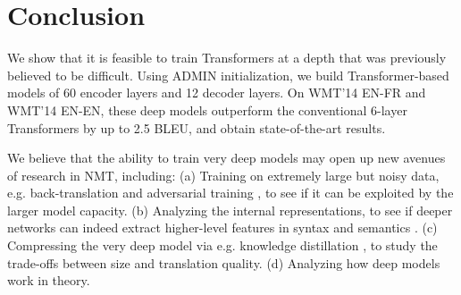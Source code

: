 
\section{Conclusion}
\label{sec:conclusion}
We show that it is feasible to train Transformers at a depth that was previously believed to be difficult. 
Using ADMIN initialization, we build Transformer-based models of 60 encoder layers and 12 decoder layers. On WMT'14 EN-FR and WMT'14 EN-EN, these deep models outperform the conventional 6-layer Transformers by up to 2.5 BLEU, and obtain state-of-the-art results.

We believe that the ability to train very deep models may open up new avenues of research in NMT, including:
(a) Training on extremely large but noisy data, e.g. back-translation \cite{edunov2018back-nmt} and adversarial training \cite{cheng2019robust,liu2020alum}, to see if it can be exploited by the larger model capacity. 
(b) Analyzing the internal representations, to see if deeper networks can indeed extract higher-level features in syntax and semantics \cite{belinkov19}. (c) Compressing the very deep model via e.g. knowledge distillation \cite{kim-rush-2016-sequence}, to study the trade-offs between size and translation quality. (d) Analyzing how deep models work \cite{allen2020backward} in theory.